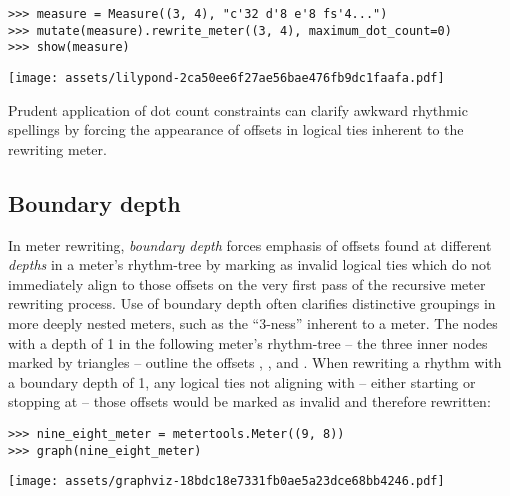 \begin{abjadbookoutput}
\begin{singlespacing}
\vspace{-0.5\baselineskip}
\begin{verbatim}
>>> measure = Measure((3, 4), "c'32 d'8 e'8 fs'4...")
>>> mutate(measure).rewrite_meter((3, 4), maximum_dot_count=0)
>>> show(measure)
\end{verbatim}
\noindent\texttt{[image: assets/lilypond-2ca50ee6f27ae56bae476fb9dc1faafa.pdf]}
\end{singlespacing}
\end{abjadbookoutput}

\noindent Prudent application of dot count constraints can clarify awkward
rhythmic spellings by forcing the appearance of offsets in logical ties
inherent to the rewriting meter.

\subsection{Boundary depth} %
\label{ssec:boundary-depth}

In meter rewriting, \emph{boundary depth} forces emphasis of offsets found at
different \emph{depths} in a meter's rhythm-tree by marking as invalid logical
ties which do not immediately align to those offsets on the very first pass of
the recursive meter rewriting process. Use of boundary depth often clarifies
distinctive groupings in more deeply nested meters, such as the
\enquote{3-ness} inherent to a  meter. The nodes with a depth of 1
in the following  meter's rhythm-tree -- the three 
inner nodes marked by triangles -- outline the offsets ,
,  and . When rewriting a 
rhythm with a boundary depth of 1, any logical ties not aligning with -- either
starting or stopping at -- those offsets would be marked as invalid and
therefore rewritten:

\begin{comment}
<abjad>
nine_eight_meter = metertools.Meter((9, 8))
graph(nine_eight_meter)
</abjad>
\end{comment}

\begin{abjadbookoutput}
\begin{singlespacing}
\vspace{-0.5\baselineskip}
\begin{verbatim}
>>> nine_eight_meter = metertools.Meter((9, 8))
>>> graph(nine_eight_meter)
\end{verbatim}
\noindent\texttt{[image: assets/graphviz-18bdc18e7331fb0ae5a23dce68bb4246.pdf]}
\end{singlespacing}
\end{abjadbookoutput}


